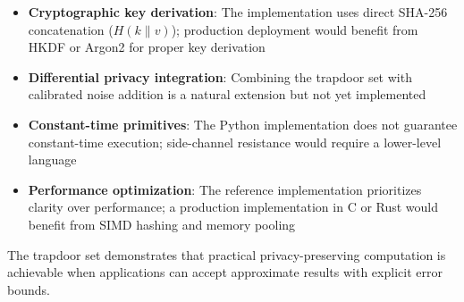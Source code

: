 \documentclass[10pt,conference]{IEEEtran}
\begin{document}
\begin{itemize}
\item \textbf{Cryptographic key derivation}: The implementation uses direct SHA-256 concatenation ($H(k \| v)$); production deployment would benefit from HKDF or Argon2 for proper key derivation
\item \textbf{Differential privacy integration}: Combining the trapdoor set with calibrated noise addition is a natural extension but not yet implemented
\item \textbf{Constant-time primitives}: The Python implementation does not guarantee constant-time execution; side-channel resistance would require a lower-level language
\item \textbf{Performance optimization}: The reference implementation prioritizes clarity over performance; a production implementation in C or Rust would benefit from SIMD hashing and memory pooling
\end{itemize}

The trapdoor set demonstrates that practical privacy-preserving computation is achievable when applications can accept approximate results with explicit error bounds.



\end{document}
